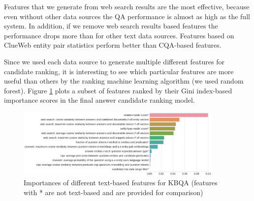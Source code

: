Features that we generate from web search results are the most effective, because even without other data sources the QA performance is almost as high as the full system.
In addition, if we remove web search results based features the performance drops more than for other text data sources.
Features based on ClueWeb entity pair statistics perform better than CQA-based features.


Since we used each data source to generate multiple different features for candidate ranking, it is interesting to see which particular features are  more useful than others by the ranking machine learning algorithm (we used random forest).
Figure \ref{fig:text2kb:feature_importances} plots a subset of features ranked by their Gini index-based importance scores in the final answer candidate ranking model.

\begin{figure}
\centering
\includegraphics[width=0.9\textwidth]{img/feature_importances}
\caption{Importances of different text-based features for KBQA (features with * are not text-based and are provided for comparison)}
\label{fig:text2kb:feature_importances}
\end{figure}

